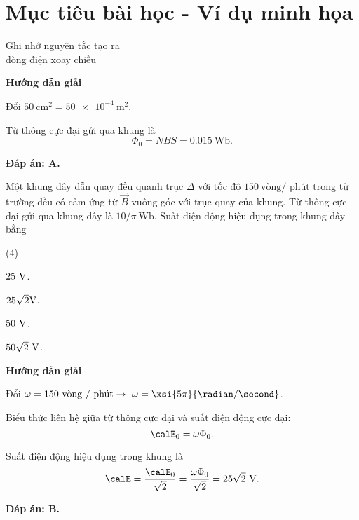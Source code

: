 \section{Mục tiêu bài học - Ví dụ minh họa}
\begin{dang}{Ghi nhớ nguyên tắc tạo ra\\ dòng điện xoay chiều}
	
	{\begin{center}
			\textbf{Hướng dẫn giải}
		\end{center}
		
		Đổi $\SI{50}{\centi \meter \squared} = \SI{50e-4}{\meter \squared}$.
		
		Từ thông cực đại gửi qua khung là
		$$\Phi_0=NBS = \SI{0.015}{\weber}.$$
		
		
		
		\textbf{Đáp án: A.}
	}
		{Một khung dây dẫn quay đều quanh trục $\Delta$ với tốc độ $150\ \text{vòng/ phút}$ trong từ trường đều có cảm ứng từ $\vec{B}$ vuông góc với trục quay của khung. Từ thông cực đại gửi qua khung dây là $10/ \pi \ \text{Wb}$. Suất điện động hiệu dụng trong khung dây bằng
		\begin{mcq}(4)
			\item $25\ \text V$.
			\item $25\sqrt 2 \text V$.
			\item $50\ \text V$.
			\item $50\sqrt 2 \ \text V$.
		\end{mcq}
	}
	{\begin{center}
			\textbf{Hướng dẫn giải}
		\end{center}
		
		Đổi $\omega = 150\ \text{vòng / phút} \rightarrow\ \omega= \xsi{5\pi}{\radian/ \second}$.
		
		Biểu thức liên hệ giữa từ thông cực đại và suất điện động cực đại:
		$$\calE_0 = \omega \Phi_0.$$
		
		
		Suất điện động hiệu dụng trong khung là
		$$\calE=\dfrac{\calE_0}{\sqrt 2} = \dfrac{\omega \Phi_0}{\sqrt 2} = 25\sqrt 2\ \text V.$$
		
		\textbf{Đáp án: B.}
	}
	
	
\end{dang}

